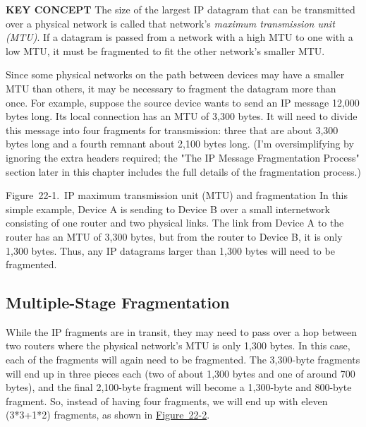 \documentclass[b5paper,11pt]{memoir}
\begin{document}
{\textbf{KEY CONCEPT}} The size of the largest IP datagram that can be
transmitted over a physical network is called that network's
{\emph{maximum transmission unit (MTU)}}. If a datagram is passed from a
network with a high MTU to one with a low MTU, it must be fragmented to
fit the other network's smaller MTU.

Since some physical networks on the path between devices may have a
smaller MTU than others, it may be necessary to fragment the datagram
more than once. For example, suppose the source device wants to send an
IP message 12,000 bytes long. Its local connection has an MTU of 3,300
bytes. It will need to divide this message into four fragments for
transmission: three that are about 3,300 bytes long and a fourth remnant
about 2,100 bytes long. (I'm oversimplifying by ignoring the extra
headers required; the "The IP Message Fragmentation Process" section
later in this chapter includes the full details of the fragmentation
process.)

\protect\hypertarget{ch22.htmlux5cux23ip_maximum_transmission_unit_mtu_and_fra}{}{}

\protect\hypertarget{ch22.htmlux5cux23I_mediaobject8_d1e23789}{}{}

Figure~22-1.~IP maximum transmission unit (MTU) and fragmentation In
this simple example, Device A is sending to Device B over a small
internetwork consisting of one router and two physical links. The link
from Device A to the router has an MTU of 3,300 bytes, but from the
router to Device B, it is only 1,300 bytes. Thus, any IP datagrams
larger than 1,300 bytes will need to be fragmented.

\subsection[Multiple-Stage
Fragmentation]{\texorpdfstring{\protect\hypertarget{ch22.htmlux5cux23multiple-stage_fragmentation}{}{}Multiple-Stage
Fragmentation}{Multiple-Stage Fragmentation}}

While the \protect\hypertarget{ch22.htmlux5cux23idx-CHP-22-0802}{}{}IP
fragments are in transit, they may need to pass over a hop between two
routers where the physical network's MTU is only 1,300 bytes. In this
case, each of the fragments will again need to be fragmented. The
3,300-byte fragments will end up in three pieces each (two of about
1,300 bytes and one of around 700 bytes), and the final 2,100-byte
fragment will become a 1,300-byte and 800-byte fragment. So, instead of
having four fragments, we will end up with eleven (3*3+1*2) fragments,
as shown in
\protect\hyperlink{ch22.htmlux5cux23ipv4_datagram_fragmentation_this_example}{Figure~22-2}.
\end{document}
